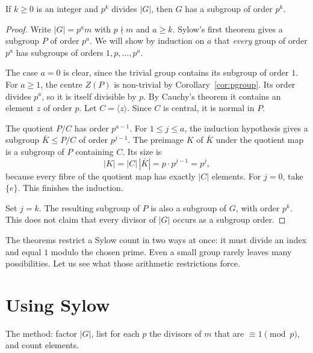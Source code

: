 \begin{corollary}\label{cor:pk}
If $k\ge0$ is an integer and $p^k$ divides $|G|$, then $G$ has a subgroup of order $p^k$.
\end{corollary}
\begin{proof}
Write $|G|=p^am$ with $p\nmid m$ and $a\ge k$.
Sylow's first theorem gives a subgroup $P$
of order $p^a$. We will show by induction
on $a$ that \emph{every} group of order $p^a$
has subgroups of orders $1,p,\ldots,p^a$.

The case $a=0$ is clear, since the trivial
group contains its subgroup of order $1$.
For $a\ge1$, the centre $Z(P)$ is non-trivial
by Corollary~\ref{cor:pgroup}. Its order
divides $p^a$, so it is itself divisible
by $p$. By Cauchy's theorem it contains
an element $z$ of order $p$.
Let $C=\langle z\rangle$. Since $C$ is
central, it is normal in $P$.

The quotient $P/C$ has order $p^{a-1}$.
For $1\le j\le a$, the induction hypothesis
gives a subgroup $\bar K\le P/C$ of order
$p^{j-1}$. The preimage $K$ of $\bar K$
under the quotient map is a subgroup of $P$
containing $C$. Its size is
\[
|K|=|C|\,|\bar K|=p\cdot p^{j-1}=p^j,
\]
because every fibre of the quotient map
has exactly $|C|$ elements.
For $j=0$, take $\{e\}$.
This finishes the induction.

Set $j=k$. The resulting subgroup of $P$
is also a subgroup of $G$, with order $p^k$.
This does not claim that every divisor of
$|G|$ occurs as a subgroup order.
\end{proof}

The theorems restrict a Sylow count in two ways at once: it must divide an index and equal $1$ modulo the chosen prime. Even a small group rarely leaves many possibilities. Let us see what those arithmetic restrictions force.

\section{Using Sylow}

The method: factor $|G|$, list for each $p$ the divisors of $m$ that are $\equiv1\pmod p$, and count elements.

